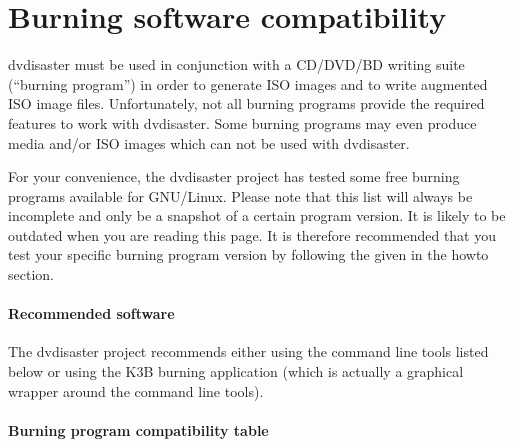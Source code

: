 \section{Burning software compatibility}
\label{burning-compatibility}

dvdisaster must be used in conjunction with a CD/DVD/BD writing suite (``burning program'')
in order to generate ISO images and to write augmented ISO image files. Unfortunately,
not all burning programs provide the required features to work with dvdisaster.
Some burning programs may even produce media and/or ISO images which can not be
used with dvdisaster.

\smallskip

For your convenience, the dvdisaster project has tested some free burning programs
available for GNU/Linux. Please note that this list will always be incomplete and
only be a snapshot of a certain program version. It is likely to be outdated when
you are reading this page. It is therefore recommended that you test your specific
burning program version by following the  given
in the howto section.

\paragraph{Recommended software}\quad

\medskip

The dvdisaster project recommends either using the command line tools
listed below or using the K3B burning application (which is actually
a graphical wrapper around the command line tools).

\paragraph{Burning program compatibility table}\quad

\medskip

\newcommand{\tgrey}[1]{\cellcolor{dkgrey}#1}
\newcommand{\tturquoise}[1]{\cellcolor{turquoise}#1}
\newcommand{\tpink}[1]{\cellcolor{pink}#1}
\newcommand{\tblue}[1]{\cellcolor{dkblue}#1}

\newcommand{\tred}[1]{&\begin{minipage}{10mm}{\cellcolor{ltred}#1}\end{minipage}}
\newcommand{\tyellow}[1]{&\begin{minipage}{10mm}\cellcolor{ltyellow}{#1}\end{minipage}}
\newcommand{\ok}{&\cellcolor{ltgreen}OK}
\newcommand{\na}{&\cellcolor{ltgrey}n.a.}
\newcommand{\nt}{&\begin{minipage}{10mm}{not tested}\end{minipage}}

